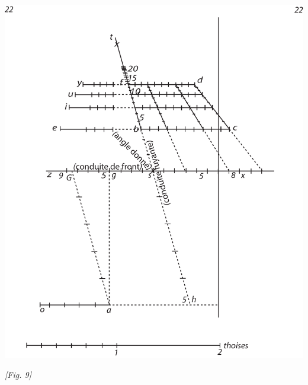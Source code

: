 \begin{center}
\includegraphics[width=1.0\textwidth]{images/T22-Desargues}
\\\rule[-4mm]{0mm}{10mm}\textit{[Fig. 9]}
\end{center}